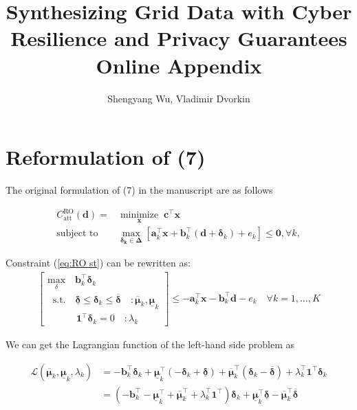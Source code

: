 \documentclass{article}
\title{\Large \bf Synthesizing Grid Data with Cyber Resilience and Privacy Guarantees \\ \vspace{0.5cm} \large Online Appendix}
\author{Shengyang Wu, Vladimir Dvorkin}
\date{}
\newcommand{\mb}[1]{\mathbf{#1}}
\newcommand{\mbg}[1]{\boldsymbol{#1}}
\newcommand{\minimize}[1]{\underset{{#1}}{\text{minimize}}}
\newcommand{\st}{\text{subject to}}
\begin{document}
\maketitle
\section{Reformulation of (7)}

The original formulation of (7) in the manuscript are as follows

\begin{subequations}\label{prob:RO}
\begin{align}
    C_{\text{att}}^{\text{RO}}(\mb{d})=&\;\minimize{\mb{x}}\;\; \mb{c}^{\top}\mb{x}\\
    \st\;\;\;& \underset{\mbg{\delta_k\in\Delta}}{\max}\left[\mb{a}_{k}^{\top}\mb{x} + \mb{b}_{k}^{\top}(\mb{d}+\bm{\delta}_k) + e_{k}\right] \leqslant \mb{0},\forall k,\!\!\! \label{eq:RO st}
\end{align}
\end{subequations}

Constraint (\ref{eq:RO st}) can be rewritten as:
\begin{align}
    \left[
    \begin{array}{l}
        \underset{\delta}{\text{max}}\quad \mb{b}_{k}^{\top}\mbg{\delta}_{k}   \\
        \;\;\text{s.t.}\quad \underline{\mbg{\delta}} \leqslant \mbg{\delta}_{k} \leqslant \overline{\mbg{\delta}} \quad :\overline{\mbg{\mu}}_k,\underline{\mbg{\mu}}_k\\
        \quad\quad\quad \bm{1}^{\top}\mbg{\delta}_{k}=0 \quad :\lambda_k
    \end{array}
    \right]
    \leqslant -\mb{a}_{k}^{\top}\mb{x}-\mb{b}_k^{\top}\mb{d}-e_{k}\quad \forall k=1,\dots,K
    \label{eq:Princeton_BkConstraint}
\end{align}

We can get the Lagrangian function of the left-hand side problem as 

\begin{align}
    \mathcal{L}(\overline{\mbg{\mu}}_k,\underline{\mbg{\mu}}_k,\lambda_k)&=-\mb{b}_{k}^{\top}\mbg{\delta}_{k}+\underline{\mbg{\mu}}_k^{\top}(-\mbg{\delta}_{k}+\underline{\mbg{\delta}})+\overline{\mbg{\mu}}_k^{\top}(\mbg{\delta}_{k}-\overline{\mbg{\delta}})+\lambda_k^{\top}\bm{1}^{\top}\mbg{\delta}_{k} \\ \nonumber
    &=(-\mb{b}_{k}^{\top}-\underline{\mbg{\mu}}_k^{\top}+\overline{\mbg{\mu}}_k^{\top}+\lambda_k^{\top}\bm{1}^{\top})\mbg{\delta}_{k} +\underline{\mbg{\mu}}_k^{\top}\underline{\mbg{\delta}}-\overline{\mbg{\mu}}_k^{\top}\overline{\mbg{\delta}}
\end{align}
\end{document}
